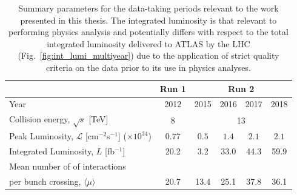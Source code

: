 \begin{table}[!htb]
    \begin{center}
        \begin{tabular}{l | c | c c c c }
        \hline
        \hline
        & \textbf{Run 1} & \multicolumn{4}{c}{\textbf{Run 2}} \\
        \hline
        Year & 2012 & 2015 & 2016 & 2017 & 2018 \\
        \hline
        Collision energy, $\sqrt{s}$ [TeV] & 8 & \multicolumn{4}{c}{13} \\
        Peak Luminosity, $\mathcal{L}$ [cm$^{-2}$s$^{-1}$] ($\times10^{34}$) & $0.77$ & $0.5$ & $1.4$ & $2.1$ & $2.1$ \\ 
        Integrated Luminosity, $L$ [fb$^{-1}$] & 20.2 & 3.2 & 33.0 & 44.3 & 59.9 \\
        Mean number of of interactions & & & & & \\
        \hspace{1.7cm} per bunch crossing, $\langle \mu \rangle$ & 20.7 & 13.4 & 25.1 & 37.8 & 36.1 \\
        \hline
        \hline
        \end{tabular}
        \caption{
            Summary parameters for the data-taking periods relevant to the work
            presented in this thesis. The integrated luminosity is that relevant
            to performing physics analysis and potentially differs with respect to
            the total integrated luminosity delivered to ATLAS by the LHC (Fig.~\ref{fig:int_lumi_multiyear}) due to
            the application of strict quality criteria on the data prior to its use
            in physics analyses.
        }
        \label{tab:lumi_tab}
    \end{center}
\end{table}

